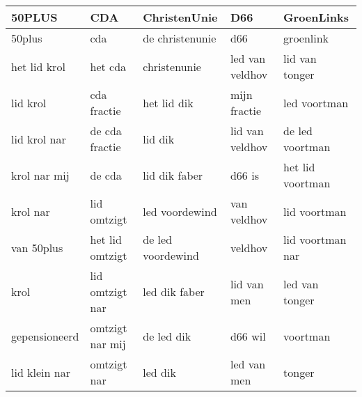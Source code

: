 \begin{tabular}{lllll}
\toprule
        50PLUS &              CDA &       ChristenUnie &              D66 &        GroenLinks \\
\midrule
        50plus &              cda &    de christenunie &              d66 &         groenlink \\
  het lid krol &          het cda &       christenunie &  led van veldhov &    lid van tonger \\
      lid krol &      cda fractie &        het lid dik &     mijn fractie &      led voortman \\
  lid krol nar &   de cda fractie &            lid dik &  lid van veldhov &   de led voortman \\
  krol nar mij &           de cda &      lid dik faber &           d66 is &  het lid voortman \\
      krol nar &      lid omtzigt &     led voordewind &      van veldhov &      lid voortman \\
    van 50plus &  het lid omtzigt &  de led voordewind &          veldhov &  lid voortman nar \\
          krol &  lid omtzigt nar &      led dik faber &      lid van men &    led van tonger \\
 gepensioneerd &  omtzigt nar mij &         de led dik &          d66 wil &          voortman \\
 lid klein nar &      omtzigt nar &            led dik &      led van men &            tonger \\
\bottomrule
\end{tabular}
